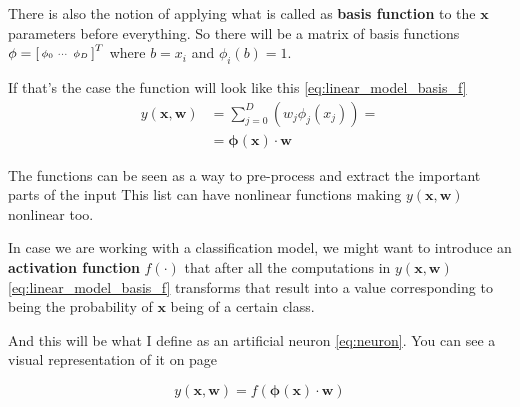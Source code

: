 \documentclass[a4paper,12pt]{article}
\theoremstyle{mytheoremstyle}
\theoremstyle{mytheoremstyle}
\theoremstyle{myproblemstyle}
\begin{document}
    There is also the notion of applying what is called as \textbf{basis
    function} to the $ \mathbf{x} $ parameters before everything. So there will
    be a matrix of basis functions $ \mathbf{\phi} =
    \begin{bsmallmatrix}\phi_{0}&\cdots&\phi_{D}\end{bsmallmatrix}^{T} $ where
    $ b = x_{i} $ and $ \phi_{i}(b) = 1 $.

    If that's the case the function will look like this
    \eqref{eq:linear_model_basis_f}
    \begin{equation}
        \begin{split}
            y(\mathbf{x}, \mathbf{w}) & =
            \displaystyle\sum_{j=0}^{D}\left(w_{j}\phi_{j}(x_{j})\right) = \\
            & = \mathbf{\phi}\left(\mathbf{x}\right)\cdot\mathbf{w}
        \end{split}
        \label{eq:linear_model_basis_f}
    \end{equation}

    The functions can be seen as a way to pre-process and extract the important
    parts of the input This list can have nonlinear functions making $
    y(\mathbf{x}, \mathbf{w}) $ nonlinear too.

    In case we are working with a classification model, we might want to
    introduce an \textbf{activation function} $ f\left(\cdot\right) $ that
    after all the computations in $ y(\mathbf{x}, \mathbf{w}) $
    \eqref{eq:linear_model_basis_f} transforms that result into a value
    corresponding to being the probability of $ \mathbf{x} $ being of a certain
    class.

    And this will be what I define as an artificial neuron \eqref{eq:neuron}.
    You can see a visual representation of it on page~\pageref{fig:neuron}

    \begin{equation}
        y(\mathbf{x}, \mathbf{w}) = f \left( \mathbf{\phi} \left( \mathbf{x}
        \right) \cdot\mathbf{w} \right)
        \label{eq:neuron}
    \end{equation}
\end{document}
